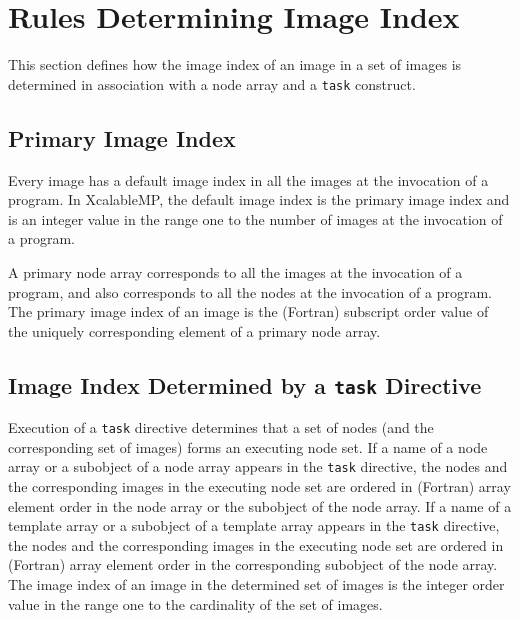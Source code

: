\section{Rules Determining Image Index}
This section defines how the image index of an image in a set of images
is determined in association with a node array and a {\tt task} construct.



\subsection{Primary Image Index}
Every image has a default image index in all the images at the
invocation of a program. 
In XcalableMP, the default image index is the primary image index
and is an integer value in the range one to the number of images
at the invocation of a program. 

A primary node array corresponds to all the images at the invocation of
a program, and also corresponds to all the nodes at the invocation of
a program.
The primary image index of an image is the (Fortran) subscript order value of 
the uniquely corresponding element of a primary node array.


\subsection{Image Index Determined by a {\tt task} Directive}

Execution of a {\tt task} directive determines that a set of nodes (and
the corresponding set of images) forms an executing node set.
If a name of a node array or a subobject of a node array 
appears in the {\tt task} directive, the nodes and the corresponding 
images in the executing node set are ordered in (Fortran) array element order in
the node array or the subobject of the node array.
If a name of a template array or a subobject of a template array
appears in the {\tt task} directive, the nodes and the corresponding images 
in the executing node set 
are ordered in (Fortran) array element order in the corresponding 
subobject of the node array.
The image index of an image in the determined set of images 
is the integer order value in the range one to the cardinality of the set of images.



